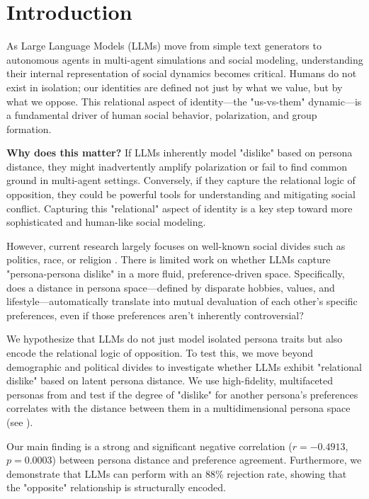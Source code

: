 \section{Introduction}

As Large Language Models (LLMs) move from simple text generators to autonomous agents in multi-agent simulations and social modeling, understanding their internal representation of social dynamics becomes critical. Humans do not exist in isolation; our identities are defined not just by what we value, but by what we oppose. This relational aspect of identity—the "us-vs-them" dynamic—is a fundamental driver of human social behavior, polarization, and group formation.

{\bf Why does this matter?} If LLMs inherently model "dislike" based on persona distance, they might inadvertently amplify polarization or fail to find common ground in multi-agent settings. Conversely, if they capture the relational logic of opposition, they could be powerful tools for understanding and mitigating social conflict. Capturing this "relational" aspect of identity is a key step toward more sophisticated and human-like social modeling.

However, current research largely focuses on well-known social divides such as politics, race, or religion \cite{dong2024persona, prama2025us}. There is limited work on whether LLMs capture "persona-persona dislike" in a more fluid, preference-driven space. Specifically, does a distance in persona space—defined by disparate hobbies, values, and lifestyle—automatically translate into mutual devaluation of each other's specific preferences, even if those preferences aren't inherently controversial?

We hypothesize that LLMs do not just model isolated persona traits but also encode the relational logic of opposition. To test this, we move beyond demographic and political divides to investigate whether LLMs exhibit "relational dislike" based on latent persona distance. We use high-fidelity, multifaceted personas from \dataset and test if the degree of "dislike" for another persona's preferences correlates with the distance between them in a multidimensional persona space (see ).

Our main finding is a strong and significant negative correlation ($r = -0.4913$, $p = 0.0003$) between persona distance and preference agreement. Furthermore, we demonstrate that LLMs can perform \schismogenesis with an 88\% rejection rate, showing that the "opposite" relationship is structurally encoded.

